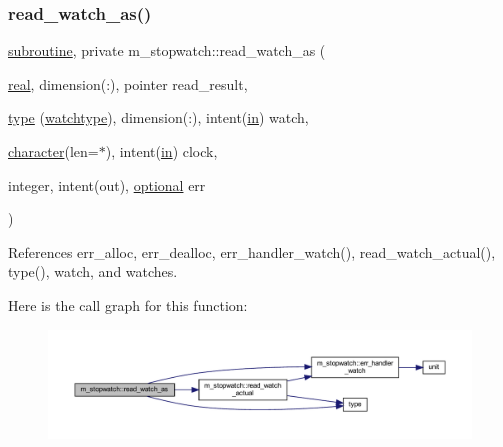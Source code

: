 \subsubsection{\texorpdfstring{read\+\_\+watch\+\_\+as()}{read\_watch\_as()}}
{\footnotesize\ttfamily \hyperlink{M__stopwatch_83_8txt_acfbcff50169d691ff02d4a123ed70482}{subroutine}, private m\+\_\+stopwatch\+::read\+\_\+watch\+\_\+as (\begin{DoxyParamCaption}\item[{\hyperlink{read__watch_83_8txt_abdb62bde002f38ef75f810d3a905a823}{real}, dimension(\+:), pointer}]{read\+\_\+result,  }\item[{\hyperlink{stop__watch_83_8txt_a70f0ead91c32e25323c03265aa302c1c}{type} (\hyperlink{structm__stopwatch_1_1watchtype}{watchtype}), dimension(\+:), intent(\hyperlink{M__journal_83_8txt_afce72651d1eed785a2132bee863b2f38}{in})}]{watch,  }\item[{\hyperlink{option__stopwatch_83_8txt_abd4b21fbbd175834027b5224bfe97e66}{character}(len=$\ast$), intent(\hyperlink{M__journal_83_8txt_afce72651d1eed785a2132bee863b2f38}{in})}]{clock,  }\item[{integer, intent(out), \hyperlink{option__stopwatch_83_8txt_aa4ece75e7acf58a4843f70fe18c3ade5}{optional}}]{err }\end{DoxyParamCaption})\hspace{0.3cm}{\ttfamily [private]}}



References err\+\_\+alloc, err\+\_\+dealloc, err\+\_\+handler\+\_\+watch(), read\+\_\+watch\+\_\+actual(), type(), watch, and watches.

Here is the call graph for this function\+:
\nopagebreak
\begin{figure}[H]
\begin{center}
\leavevmode
\includegraphics[width=350pt]{namespacem__stopwatch_a281bc81f897b1e58da49f7fbfa9f304e_cgraph}
\end{center}
\end{figure}
\mbox{\label{namespacem__stopwatch_a653b0acb543b4a6f4d75babffe91e8c8}} 
